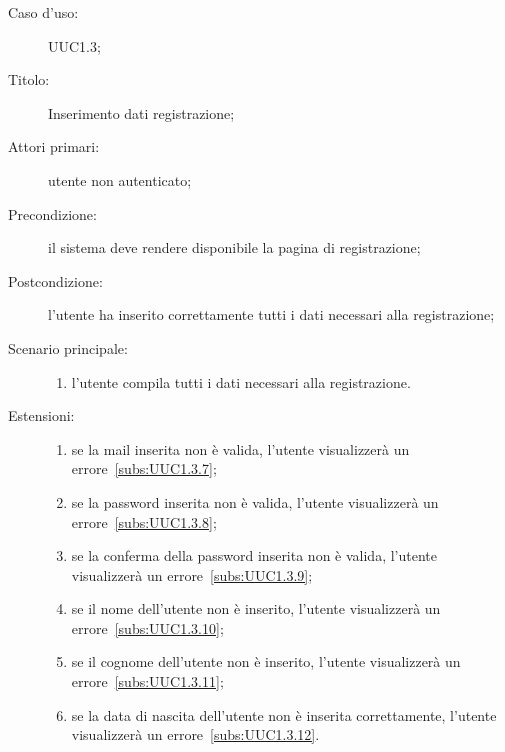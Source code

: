 \documentclass[../../../analisi-dei-requisiti.tex]{subfiles}
\begin{document}
\begin{description}
  \item[Caso d'uso:] UUC1.3;
  \item[Titolo:] Inserimento dati registrazione;
  \item[Attori primari:] utente non autenticato;
  \item[Precondizione:] il sistema deve rendere disponibile la pagina di registrazione;
  \item[Postcondizione:] l'utente ha inserito correttamente tutti i dati necessari alla registrazione;
  \item[Scenario principale:]
        \begin{enumerate}
          \item l'utente compila tutti i dati necessari alla registrazione.
        \end{enumerate}
  \item[Estensioni:]
        \begin{enumerate}
          \item se la mail inserita non è valida, l'utente visualizzerà un errore~\ref{subs:UUC1.3.7};
          \item se la password inserita non è valida, l'utente visualizzerà un errore~\ref{subs:UUC1.3.8};
          \item se la conferma della password inserita non è valida, l'utente visualizzerà un errore~\ref{subs:UUC1.3.9};
          \item se il nome dell'utente non è inserito, l'utente visualizzerà un errore~\ref{subs:UUC1.3.10};
          \item se il cognome dell'utente non è inserito, l'utente visualizzerà un errore~\ref{subs:UUC1.3.11};
          \item se la data di nascita dell'utente non è inserita correttamente, l'utente visualizzerà un errore~\ref{subs:UUC1.3.12}.
        \end{enumerate}
\end{description}
\end{document}
